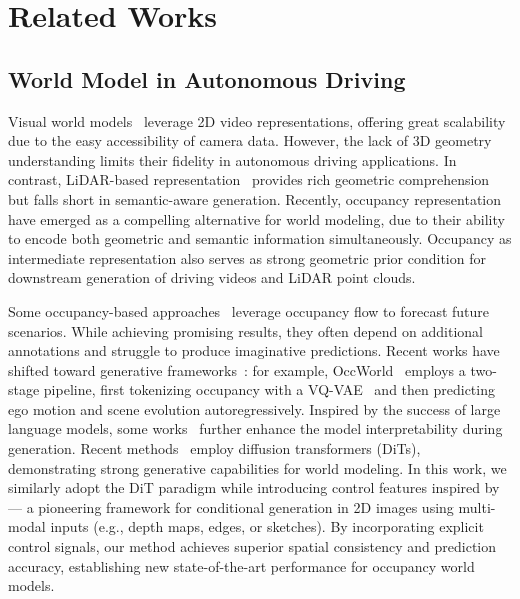 \section{Related Works}\label{sec:relatedworks}


\subsection{World Model in Autonomous Driving}
Visual world models~\cite{hu2023gaia, wang2024drivedreamer, wang2024driving} leverage 2D video representations, offering great scalability due to the easy accessibility of camera data. 
However, the lack of 3D geometry understanding limits their fidelity in autonomous driving applications.
In contrast, LiDAR-based representation~\cite{agro2024uno, khurana2023point, uniscene, yang2024visual, zyrianov2024lidardm} provides rich geometric comprehension but falls short in semantic-aware generation.
Recently, occupancy representation~\cite{occworld, occvar, dome, dfit-occworld, occ-llm, uniscene, renderworld, occllama} have emerged as a compelling alternative for world modeling, due to their ability to encode both geometric and semantic information simultaneously. Occupancy as intermediate representation also serves as strong geometric prior condition for downstream generation of driving videos\cite{drivingsphere} and LiDAR point clouds\cite{uniscene}.  

Some occupancy-based approaches~\cite{drive-occworld, dfit-occworld} leverage occupancy flow to forecast future scenarios.
While achieving promising results, they often depend on additional annotations and struggle to produce imaginative predictions.
Recent works have shifted toward generative frameworks~\cite{occworld,dome,occ-llm,occllama}: for example, OccWorld~\cite{occworld} employs a two-stage pipeline, first tokenizing occupancy with a VQ-VAE~\cite{vqvae} and then predicting ego motion and scene evolution autoregressively.
Inspired by the success of large language models, some works~\cite{occ-llm,occllama} further enhance the model interpretability during generation. 
Recent methods~\cite{dome,uniscene} employ diffusion transformers (DiTs), demonstrating strong generative capabilities for world modeling.
In this work, we similarly adopt the DiT paradigm while introducing control features inspired by \ctln{}~\cite{controlnet} — a pioneering framework for conditional generation in 2D images using multi-modal inputs (e.g., depth maps, edges, or sketches). 
By incorporating explicit control signals, our method achieves superior spatial consistency and prediction accuracy, establishing new state-of-the-art performance for occupancy world models.



